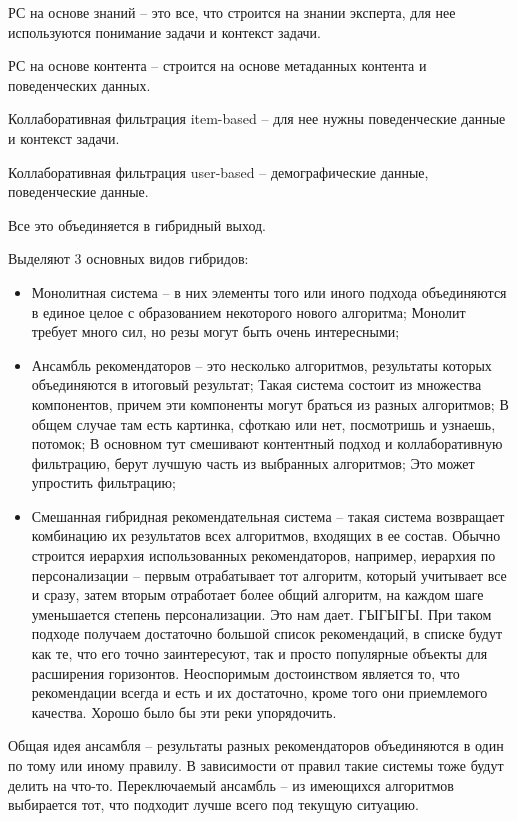 РС на основе знаний -- это все, что строится на знании эксперта, для нее используются понимание задачи и контекст задачи.

РС на основе контента -- строится на основе метаданных контента и поведенческих данных.

Коллаборативная фильтрация item-based -- для нее нужны поведенческие данные и контекст задачи.

Коллаборативная фильтрация user-based -- демографические данные, поведенческие данные.

Все это объединяется в гибридный выход. 

Выделяют 3 основных видов гибридов:

\begin{itemize}
    \item Монолитная система -- в них элементы того или иного подхода объединяются в единое целое с образованием некоторого нового алгоритма; Монолит требует много сил, но резы могут быть очень интересными;
    \item Ансамбль рекомендаторов -- это несколько алгоритмов, результаты которых объединяются в итоговый результат; Такая система состоит из множества компонентов, причем эти компоненты могут браться из разных алгоритмов; В общем случае там есть картинка, сфоткаю или нет, посмотришь и узнаешь, потомок; В основном тут смешивают контентный подход и коллаборативную фильтрацию, берут лучшую часть из выбранных алгоритмов; Это может упростить фильтрацию; 
    \item Смешанная гибридная рекомендательная система -- такая система возвращает комбинацию их результатов всех алгоритмов, входящих в ее состав. Обычно строится иерархия использованных рекомендаторов, например, иерархия по персонализации -- первым отрабатывает тот алгоритм, который учитывает все и сразу, затем вторым отработает более общий алгоритм, на каждом шаге уменьшается степень персонализации. Это нам дает. ГЫГЫГЫ. При таком подходе получаем достаточно большой список рекомендаций, в списке будут как те, что его точно заинтересуют, так и просто популярные объекты для расширения горизонтов. Неоспоримым достоинством является то, что рекомендации всегда и есть и их достаточно, кроме того они приемлемого качества. Хорошо было бы эти реки упорядочить. 
\end{itemize}

Общая идея ансамбля -- результаты разных рекомендаторов объединяются в один по тому или иному правилу. В зависимости от правил такие системы тоже будут делить на что-то. Переключаемый ансамбль -- из имеющихся алгоритмов выбирается тот, что подходит лучше всего под текущую ситуацию.

